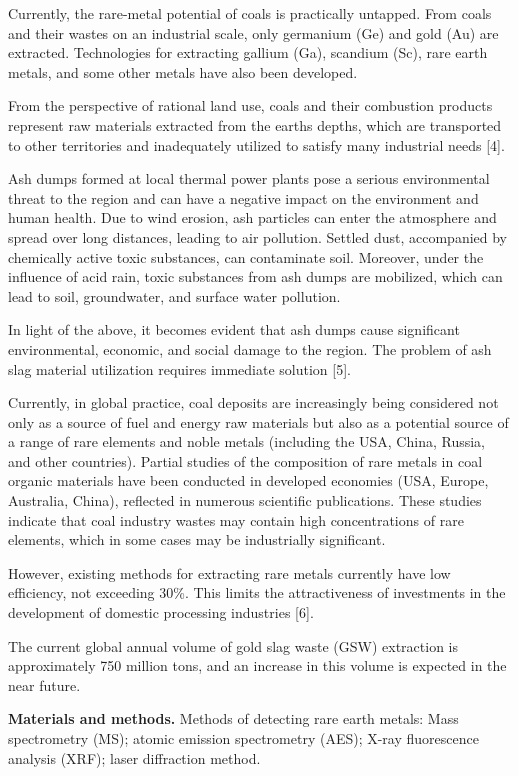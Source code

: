 Currently, the rare-metal potential of coals is practically untapped.
From coals and their wastes on an industrial scale, only germanium (Ge)
and gold (Au) are extracted. Technologies for extracting gallium (Ga),
scandium (Sc), rare earth metals, and some other metals have also been
developed.

From the perspective of rational land use, coals and their combustion
products represent raw materials extracted from the
earth\textquotesingle s depths, which are transported to other
territories and inadequately utilized to satisfy many industrial needs
{[}4{]}.

Ash dumps formed at local thermal power plants pose a serious
environmental threat to the region and can have a negative impact on the
environment and human health. Due to wind erosion, ash particles can
enter the atmosphere and spread over long distances, leading to air
pollution. Settled dust, accompanied by chemically active toxic
substances, can contaminate soil. Moreover, under the influence of acid
rain, toxic substances from ash dumps are mobilized, which can lead to
soil, groundwater, and surface water pollution.

In light of the above, it becomes evident that ash dumps cause
significant environmental, economic, and social damage to the region.
The problem of ash slag material utilization requires immediate solution
{[}5{]}.

Currently, in global practice, coal deposits are increasingly being
considered not only as a source of fuel and energy raw materials but
also as a potential source of a range of rare elements and noble metals
(including the USA, China, Russia, and other countries). Partial studies
of the composition of rare metals in coal organic materials have been
conducted in developed economies (USA, Europe, Australia, China),
reflected in numerous scientific publications. These studies indicate
that coal industry wastes may contain high concentrations of rare
elements, which in some cases may be industrially significant.

However, existing methods for extracting rare metals currently have low
efficiency, not exceeding 30\%. This limits the attractiveness of
investments in the development of domestic processing industries
{[}6{]}.

The current global annual volume of gold slag waste (GSW) extraction is
approximately 750 million tons, and an increase in this volume is
expected in the near future.

{\bfseries Materials and methods.} Methods of detecting rare earth metals:
Mass spectrometry (MS); atomic emission spectrometry (AES); X-ray
fluorescence analysis (XRF); laser diffraction method.

